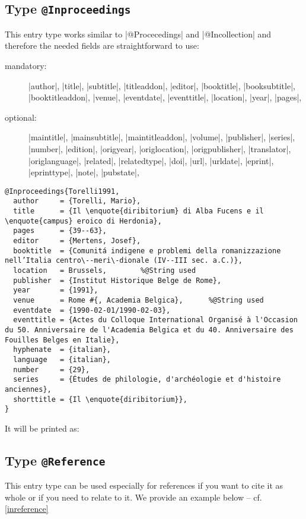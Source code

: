 \documentclass[a4paper,
10pt,
greek,
french,
spanish,
italian,
ngerman,
english
]{ltxdoc}
\begin{document}
\subsection{Type \texttt{@Inproceedings}}\label{inproceedings}
This entry type works similar to |@Procecedings| and |@Incollection| and therefore the needed fields are straightforward to use:

\begin{description}
\item[mandatory:] 
|author|, |title|, |subtitle|, |titleaddon|,
|editor|,  |booktitle|, |booksubtitle|, |booktitleaddon|,
|venue|, |eventdate|, |eventtitle|,
|location|, |year|, |pages|, 
\item[optional:]
|maintitle|, |mainsubtitle|, |maintitleaddon|, |volume|, 
|publisher|, |series|, |number|, |edition|, 
|origyear|, |origlocation|, |origpublisher|, 
|translator|, |origlanguage|,
|related|, |relatedtype|,
|doi|, |url|, |urldate|, |eprint|, |eprinttype|, |note|, |pubstate|, 
\end{description}
 
 
 
 \begin{lstlisting}[style=bibentry,label=Torelli1991,caption={{@}Inproceedings\{Torelli1991,…\} }]
@Inproceedings{Torelli1991,
  author     = {Torelli, Mario},
  title      = {Il \enquote{diribitorium} di Alba Fucens e il \enquote{campus} eroico di Herdonia},
  pages      = {39--63},
  editor     = {Mertens, Josef},
  booktitle  = {Comunitá indigene e problemi della romanizzazione nell’Italia centro\--meri\-dionale (IV--III sec. a.C.)},
  location   = Brussels, 		%@String used
  publisher  = {Institut Historique Belge de Rome},
  year       = {1991},
  venue      = Rome #{, Academia Belgica},		%@String used
  eventdate  = {1990-02-01/1990-02-03},
  eventtitle = {Actes du Colloque International Organisé à l'Occasion du 50. Anniversaire de l'Academia Belgica et du 40. Anniversaire des Fouilles Belges en Italie},
  hyphenate  = {italian},
  language   = {italian},
  number     = {29},
  series     = {Études de philologie, d'archéologie et d'histoire anciennes},
  shorttitle = {Il \enquote{diribitorium}},
}
\end{lstlisting}
It will be printed as:
 

 \subsection{Type \texttt{@Reference}}\label{reference}
 This entry type can be used especially for references if you want to cite it as whole or if you need to relate to it. 
We provide an example below -- cf. \cref{inreference}
\end{document}
